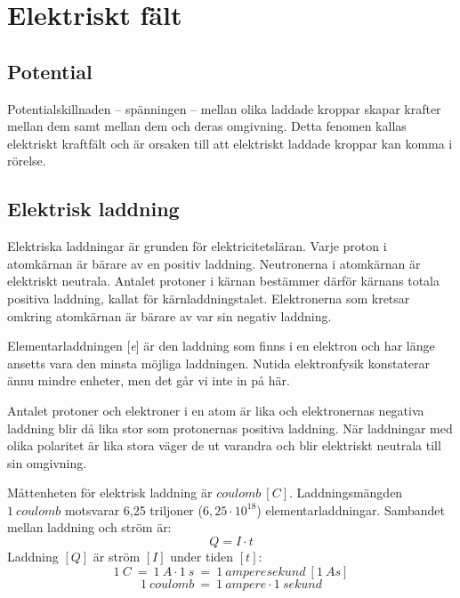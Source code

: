 \section{Elektriskt fält}
\label{sec:elektriska-faelt}

\subsection{Potential}

Potentialskillnaden -- spänningen -- mellan olika laddade kroppar skapar
krafter mellan dem samt mellan dem och deras omgivning.
Detta fenomen kallas elektriskt kraftfält och är orsaken till att elektriskt
laddade kroppar kan komma i rörelse.

\subsection{Elektrisk laddning}

Elektriska laddningar är grunden för elektricitetsläran.
Varje proton i atomkärnan är bärare av en positiv laddning.
Neutronerna i atomkärnan är elektriskt neutrala.
Antalet protoner i kärnan bestämmer därför kärnans totala positiva
laddning, kallat för kärnladdningstalet.
Elektronerna som kretsar omkring atomkärnan är bärare av var sin negativ
laddning.

Elementarladdningen [\emph{e}] är den laddning som finns i en elektron och har
länge ansetts vara den minsta möjliga laddningen.
Nutida elektronfysik konstaterar ännu mindre enheter, men det går vi inte in på
här.

Antalet protoner och elektroner i en atom är lika och elektronernas
negativa laddning blir då lika stor som protonernas positiva laddning.
När laddningar med olika polaritet är lika stora väger de ut varandra och blir
elektriskt neutrala till sin omgivning.

Måttenheten för elektrisk laddning är \(coulomb\ [C]\).
Laddningsmängden \(1\ coulomb\) motsvarar 6,25 triljoner (\(6,25\cdot10^{18}\))
elementarladdningar. Sambandet mellan laddning och ström är:
\[Q = I \cdot t\]
Laddning $[Q]$ är ström $[I]$ under tiden $[t]$:
\[1\ C ~=~ 1\ A \cdot 1\ s ~=~ 1\ \textit{amperesekund}\ [1\ As]\]
\[1\ \textit{coulomb} ~=~ 1\ \textit{ampere} \cdot 1\ \textit{sekund}\]

